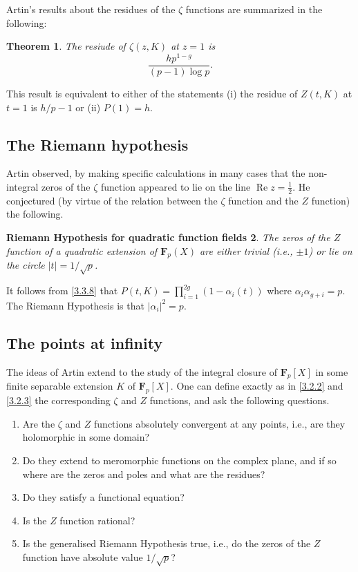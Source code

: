\documentclass[10pt]{article}
\newtheorem{theo}{Theorem}[subsection]
\newtheorem{rhqff}[theo]{Riemann Hypothesis for quadratic function fields}
\theoremstyle{definition}
\def\FF{\mathbf{F}}
\DeclareMathOperator{\re}{Re}
\begin{document}
Artin's results about the residues of the $\zeta$ functions are summarized in the following:

\begin{theo}
\label{3.3.9}
The resiude of $\zeta(z,K)$ at $z = 1$ is
\[
\frac{hp^{1-g}}{(p-1)\log p}.
\]
\end{theo}


This result is equivalent to either of the statements (i) the residue of $Z(t,K)$ at $t=1$ is $h/p-1$ or (ii) $P(1) = h$.


\subsection{The Riemann hypothesis}
\label{ch:3.4}

Artin observed, by making specific calculations in many cases that the non-integral zeros of the $\zeta$ function appeared to lie on the line $\re z = \frac12$.
He conjectured (by virtue of the relation between the $\zeta$ function and the $Z$ function) the following.


\begin{rhqff}
\label{3.4.1}
The zeros of the $Z$ function of a quadratic extension of $\FF_p(X)$ are either trivial (i.e., $\pm1$) or lie on the circle $|t| = 1/\sqrt p$.
\end{rhqff}

It follows from \eqref{3.3.8} that $P(t,K) = \prod_{i=1}^{2g} (1-\alpha_i(t))$ where $\alpha_i \alpha_{g+i} = p$.
The Riemann Hypothesis is that $|\alpha_i|^2 = p$.


\subsection{The points at infinity}
\label{ch:3.5}

The ideas of Artin extend to the study of the integral closure of $\FF_p[X]$ in some finite separable extension $K$ of $\FF_p[X]$.
One can define exactly as in \eqref{3.2.2} and \eqref{3.2.3} the corresponding $\zeta$ and $Z$ functions, and ask the following questions.

\begin{enumerate}
\item
\label{3.5.1}
Are the $\zeta$ and $Z$ functions absolutely convergent at any points, i.e., are they holomorphic in some domain?

\item
\label{3.5.2}
Do they extend to meromorphic functions on the complex plane, and if so where are the zeros and poles and what are the residues?

\item
\label{3.5.3}
Do they satisfy a functional equation?

\item
\label{3.5.4}
Is the $Z$ function rational?

\item
\label{3.5.5}
Is the generalised Riemann Hypothesis true, i.e., do the zeros of the $Z$ function have absolute value $1/\sqrt p$?
\end{enumerate}
\end{document}
